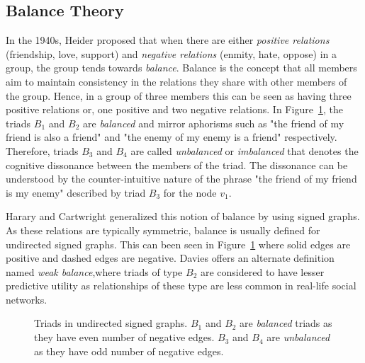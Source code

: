 \subsection{Balance Theory}
\label{sec:balance-theory}


In the 1940s, Heider \cite{heider1946attitudes} proposed  that when there are either \textit{positive relations} (friendship, love, support) and \textit{negative relations} (enmity, hate, oppose) in a group, the  group tends towards \textit{balance}.
Balance is the concept that all members aim to maintain consistency in the relations they share with other members of the group.
Hence, in a group of three members this can be seen as having three positive relations or, one positive and two negative relations.
In Figure~\ref{fig:undirected-triads}, the triads $B_1$ and $B_2$ are \textit{balanced} and mirror aphorisms such as "the friend of my friend is also a friend" and "the enemy of my enemy is a friend" respectively.
Therefore, triads $B_3$ and $B_4$ are called \textit{unbalanced} or \textit{imbalanced} that denotes the cognitive dissonance between the members of the triad.
The dissonance can be understood by the counter-intuitive nature of the phrase "the friend of my friend is my enemy" described by triad $B_3$ for the node $v_{1}$.

Harary and Cartwright \cite{cartwright1956structural} generalized this notion of balance by using signed graphs.
As these relations are typically symmetric, balance is usually defined for undirected signed graphs.
This can been seen in Figure~\ref{fig:undirected-triads} where solid edges are positive and dashed edges are negative.
Davies \cite{davis1963weakBalance} offers an alternate definition named \textit{weak balance},where triads of type $B_2$ are considered to have lesser predictive utility as relationships of these type are less common in real-life social networks.

\begin{figure}[!ht]     
    \centering
      
    \caption{Triads in undirected signed graphs. $B_1$ and $B_2$ are \textit{balanced} triads as they have even number of negative edges. $B_3$ and $B_4$ are \textit{unbalanced} as they have odd number of negative edges.}
    \label{fig:undirected-triads}
\end{figure}

